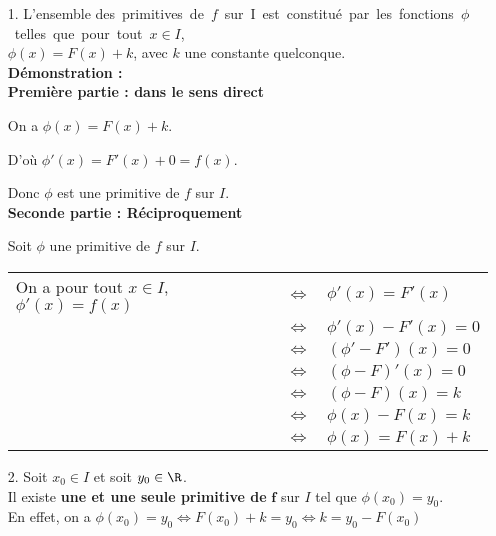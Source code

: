 \begin{itemize}
\item[1.] L'ensemble \hbox{des primitives de $f$ sur I est constitué par les fonctions $\phi$ telles que pour tout $x \in I$,} \\ $\phi\left(x\right) = F(x) + k$, avec $k$ une constante quelconque. \\

\textbf{Démonstration : } \\

\textbf{Première partie : dans le sens direct} 

On a $\phi\left(x\right) = F\left(x\right) + k$. 

D'où $\phi'\left(x\right) = F'(x) + 0 = f(x)$. 

Donc $\phi$ est une primitive de $f$ sur $I$. \\

\textbf{Seconde partie : Réciproquement} 

Soit $\phi$ une primitive de $f$ sur $I$. \\

\begin{tabular}{lll}
\hspace{-.3cm} On a pour tout $x \in I$, $\phi'\left(x\right) = f\left(x\right)$ & $\Longleftrightarrow$ & $\phi'\left(x\right) = F'\left(x\right)$ \\
& $\Longleftrightarrow$ & $\phi'\left(x\right) - F'\left(x\right) = 0$ \\
& $\Longleftrightarrow$ & $\left(\phi' - F'\right)\left(x\right) = 0$ \\
& $\Longleftrightarrow$ & $\left(\phi - F\right)'\left(x\right) = 0$ \\
& $\Longleftrightarrow$ & $\left(\phi - F\right)\left(x\right) = k$ \\
& $\Longleftrightarrow$ & $\phi\left(x\right) - F\left(x\right) = k$ \\
& $\Longleftrightarrow$ & $\phi\left(x\right) = F\left(x\right) + k$ \\
\end{tabular}

\vspace*{.3cm}

\item[2.] Soit $x_0 \in I$ et soit $y_0 \in \R$. \\

Il existe \textbf{une et une seule primitive de } $\mathbf{f}$ sur $I$ tel que $\phi\left(x_0\right) = y_0$. \\

En effet, on a $ \phi\left(x_0\right) = y_0 \Longleftrightarrow F\left(x_0\right) + k = y_0 \Longleftrightarrow k = y_0 - F(x_0)$
\end{itemize}

